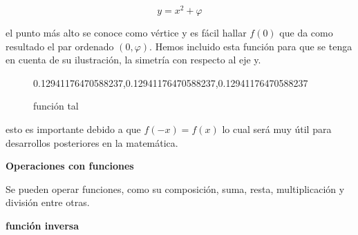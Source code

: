 \documentclass[12pt]{article}
\begin{document}
$$ y= x^{2} + \varphi $$

el punto más alto se conoce como vértice y es fácil hallar $f(0)$ que da como resultado el par ordenado $(0,\varphi)$. Hemos incluido esta función para que se tenga en cuenta de su ilustración, la simetría con respecto al eje  y.

\begin{figure}

\begin{center}

\definecolor{qqwuqq}{rgb}
{0.12941176470588237,0.12941176470588237,0.12941176470588237}
\label{fig 1}

\caption{función tal}



\end{center}

\end{figure}


esto es importante debido a que $f(-x)=f(x)$ lo cual será muy útil para desarrollos posteriores en la matemática.



\textbf{Operaciones con funciones}

Se pueden operar funciones, como su composición, suma, resta, multiplicación y división entre otras.









\textbf{función inversa}
\end{document}
